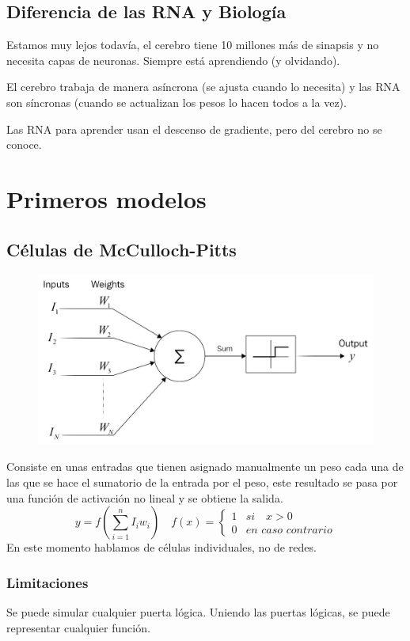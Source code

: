 \documentclass[12pt, twoside, openright]{report} %
\begin{document}
\subsection{Diferencia de las RNA y Biología}
Estamos muy lejos todavía, el cerebro tiene 10 millones más de sinapsis y no necesita capas de neuronas. Siempre está aprendiendo (y olvidando).

El cerebro trabaja de manera asíncrona (se ajusta cuando lo necesita) y las RNA son síncronas (cuando se actualizan los pesos lo hacen todos a la vez).

Las RNA para aprender usan el descenso de gradiente, pero del cerebro no se conoce.
\pagebreak

\section{Primeros modelos}
\subsection{Células de McCulloch-Pitts}
\begin{figure}[H]
	{\includegraphics[scale=.25]{McCulloch-Pitts.jpg}}
\end{figure}
Consiste en unas entradas que tienen asignado manualmente un peso cada una de las que se hace el sumatorio de la entrada por el peso, este resultado se pasa por una función de activación no lineal y se obtiene la salida.
$$y=f\left(\sum_{i=1}^n I_i w_i\right) \quad f (x) = \begin{cases}1 & \textit{si}\quad  x> 0\\0 & \textit{en caso contrario}\end{cases}$$
En este momento hablamos de células individuales, no de redes.

\subsubsection{Limitaciones}
Se puede simular cualquier puerta lógica. Uniendo las puertas lógicas, se puede representar cualquier función.
\end{document}
